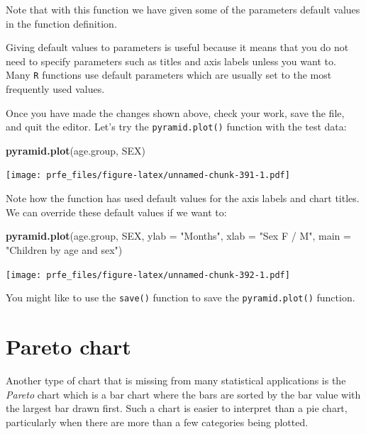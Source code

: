 \documentclass[12pt,a4paper]{book}
\newenvironment{Shaded}{\begin{snugshade}}{\end{snugshade}}
\newcommand{\DataTypeTok}[1]{\textcolor[rgb]{0.13,0.29,0.53}{#1}}
\newcommand{\KeywordTok}[1]{\textcolor[rgb]{0.13,0.29,0.53}{\textbf{#1}}}
\newcommand{\NormalTok}[1]{#1}
\newcommand{\StringTok}[1]{\textcolor[rgb]{0.31,0.60,0.02}{#1}}
\theoremstyle{definition}
\theoremstyle{definition}
\theoremstyle{definition}
\theoremstyle{remark}
\begin{document}
Note that with this function we have given some of the parameters
default values in the function definition.

Giving default values to parameters is useful because it means that you
do not need to specify parameters such as titles and axis labels unless
you want to. Many \texttt{R} functions use default parameters which are
usually set to the most frequently used values.

Once you have made the changes shown above, check your work, save the
file, and quit the editor. Let's try the \texttt{pyramid.plot()}
function with the test data:

\begin{Shaded}
\begin{Highlighting}[]
\KeywordTok{pyramid.plot}\NormalTok{(age.group, SEX)}
\end{Highlighting}
\end{Shaded}

\texttt{[image: prfe\_files/figure-latex/unnamed-chunk-391-1.pdf]}

Note how the function has used default values for the axis labels and
chart titles. We can override these default values if we want to:

\begin{Shaded}
\begin{Highlighting}[]
\KeywordTok{pyramid.plot}\NormalTok{(age.group, SEX, }\DataTypeTok{ylab =} \StringTok{"Months"}\NormalTok{, }\DataTypeTok{xlab =} \StringTok{"Sex F / M"}\NormalTok{,}
             \DataTypeTok{main =} \StringTok{"Children by age and sex"}\NormalTok{)}
\end{Highlighting}
\end{Shaded}

\texttt{[image: prfe\_files/figure-latex/unnamed-chunk-392-1.pdf]}

You might like to use the \texttt{save()} function to save the
\texttt{pyramid.plot()} function.

\hypertarget{pareto-chart}{%
\section{Pareto chart}\label{pareto-chart}}

Another type of chart that is missing from many statistical applications
is the \emph{Pareto} chart which is a bar chart where the bars are
sorted by the bar value with the largest bar drawn first. Such a chart
is easier to interpret than a pie chart, particularly when there are
more than a few categories being plotted.
\end{document}
